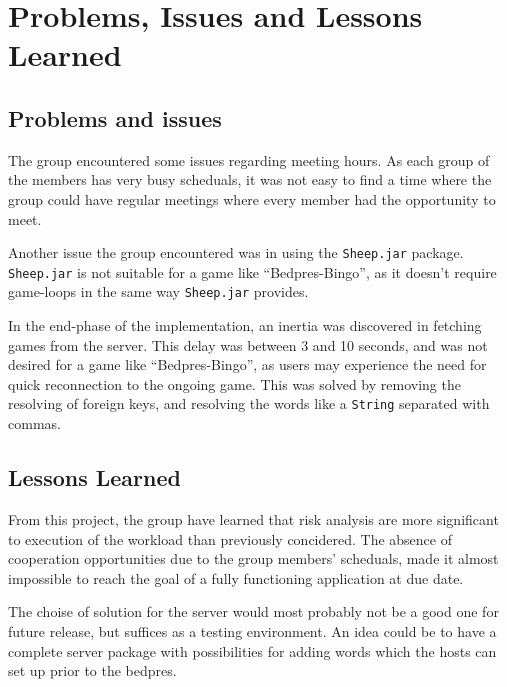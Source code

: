 \section{Problems, Issues and Lessons Learned}
\label{sec:issues}

\subsection{Problems and issues}
The group encountered some issues regarding meeting hours. As each group
of the members has very busy scheduals, it was not easy to find a time where the group could have regular meetings where every member
had the opportunity to meet.

Another issue the group encountered
was in using the \texttt{Sheep.jar} package. \texttt{Sheep.jar} is not
suitable for a game like ``Bedpres-Bingo'', as it doesn't require game-loops in the same way \texttt{Sheep.jar} provides.

In the end-phase of the implementation, an inertia was discovered in
fetching games from the server. This delay was between 3 and 10 seconds,
and was not desired for a game like ``Bedpres-Bingo'', as users may
experience the need for quick reconnection to the ongoing game. This was solved by removing the resolving of foreign keys, and resolving the words like a \texttt{String} separated with commas.

\subsection{Lessons Learned}
From this project, the group have learned that risk analysis are more
significant to execution of the workload than previously concidered.
The absence of cooperation opportunities due to the group members' scheduals,
made it almost impossible to reach the goal of a fully functioning application
at due date.

The choise of solution for the server would most probably not be a good
one for future release, but suffices as a testing environment. An idea
could be to have a complete server package with possibilities for adding
words which the hosts can set up prior to the bedpres.